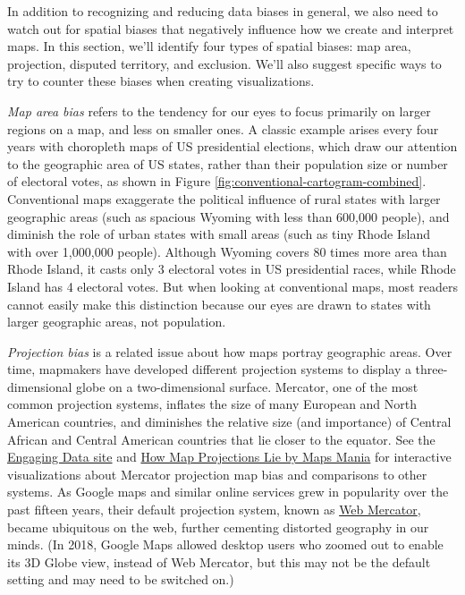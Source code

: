 \documentclass[
  english,
]{book}
\begin{document}
In addition to recognizing and reducing data biases in general, we also need to watch out for spatial biases that negatively influence how we create and interpret maps. In this section, we'll identify four types of spatial biases: map area, projection, disputed territory, and exclusion. We'll also suggest specific ways to try to counter these biases when creating visualizations.

\emph{Map area bias} refers to the tendency for our eyes to focus primarily on larger regions on a map, and less on smaller ones. A classic example arises every four years with choropleth maps of US presidential elections, which draw our attention to the geographic area of US states, rather than their population size or number of electoral votes, as shown in Figure \ref{fig:conventional-cartogram-combined}. Conventional maps exaggerate the political influence of rural states with larger geographic areas (such as spacious Wyoming with less than 600,000 people), and diminish the role of urban states with small areas (such as tiny Rhode Island with over 1,000,000 people). Although Wyoming covers 80 times more area than Rhode Island, it casts only 3 electoral votes in US presidential races, while Rhode Island has 4 electoral votes. But when looking at conventional maps, most readers cannot easily make this distinction because our eyes are drawn to states with larger geographic areas, not population.

\emph{Projection bias} is a related issue about how maps portray geographic areas. Over time, mapmakers have developed different projection systems to display a three-dimensional globe on a two-dimensional surface. Mercator, one of the most common projection systems, inflates the size of many European and North American countries, and diminishes the relative size (and importance) of Central African and Central American countries that lie closer to the equator. See the \href{https://engaging-data.com/country-sizes-mercator/}{Engaging Data site} and \href{https://googlemapsmania.blogspot.com/2020/09/how-map-projections-lie.html}{How Map Projections Lie by Maps Mania} for interactive visualizations about Mercator projection map bias and comparisons to other systems. As Google maps and similar online services grew in popularity over the past fifteen years, their default projection system, known as \href{https://en.wikipedia.org/wiki/Web_Mercator_projection}{Web Mercator}, became ubiquitous on the web, further cementing distorted geography in our minds. (In 2018, Google Maps allowed desktop users who zoomed out to enable its 3D Globe view, instead of Web Mercator, but this may not be the default setting and may need to be switched on.)
\end{document}
